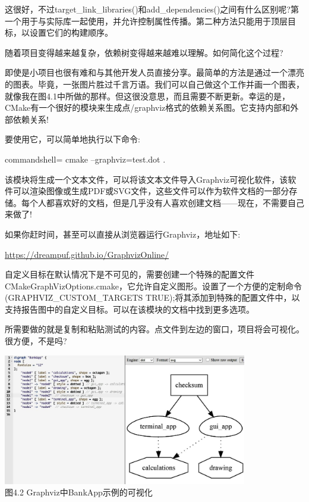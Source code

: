 这很好，不过target\_link\_libraries()和add\_dependencies()之间有什么区别呢?第一个用于与实际库一起使用，并允许控制属性传播。第二种方法只能用于顶层目标，以设置它们的构建顺序。

随着项目变得越来越复杂，依赖树变得越来越难以理解。如何简化这个过程?


即使是小项目也很有难和与其他开发人员直接分享。最简单的方法是通过一个漂亮的图表。毕竟，一张图片胜过千言万语。我们可以自己做这个工作并画一个图表，就像我在图4.1中所做的那样。但这很没意思，而且需要不断更新。幸运的是，CMake有一个很好的模块来生成点/graphviz格式的依赖关系图。它支持内部和外部依赖关系!

要使用它，可以简单地执行以下命令:

\begin{tcblisting}{commandshell={}}
cmake --graphviz=test.dot .
\end{tcblisting}

该模块将生成一个文本文件，可以将该文本文件导入Graphviz可视化软件，该软件可以渲染图像或生成PDF或SVG文件，这些文件可以作为软件文档的一部分存储。每个人都喜欢好的文档，但是几乎没有人喜欢创建文档——现在，不需要自己来做了!

如果你赶时间，甚至可以直接从浏览器运行Graphviz，地址如下:

\url{https://dreampuf.github.io/GraphvizOnline/}

\begin{tcolorbox}[colback=blue!5!white,colframe=blue!75!black,title=重要的Note]
自定义目标在默认情况下是不可见的，需要创建一个特殊的配置文件CMakeGraphVizOptions.cmake，它允许自定义图形。设置了一个方便的定制命令(GRAPHVIZ\_CUSTOM\_TARGETS TRUE);将其添加到特殊的配置文件中，以支持报告图中的自定义目标。可以在该模块的文档中找到更多选项。
\end{tcolorbox}

所需要做的就是复制和粘贴测试的内容。点文件到左边的窗口，项目将会可视化。很方便，不是吗?

\begin{center}
\includegraphics[width=0.8\textwidth]{content/2/chapter4/images/2.jpg}\\
图4.2  Graphviz中BankApp示例的可视化
\end{center}

